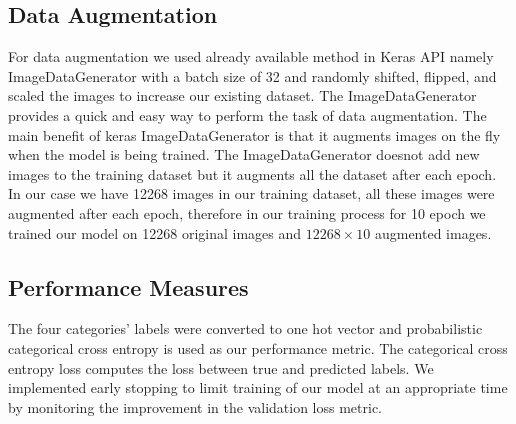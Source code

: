 \documentclass{report}
\begin{document}
\subsection{Data Augmentation}
For data augmentation we used already available method in Keras API namely ImageDataGenerator with a batch size of 32 and randomly shifted, flipped, and scaled the images to increase our existing dataset. The ImageDataGenerator provides a quick and easy way to perform the task of data augmentation.  The main benefit of keras ImageDataGenerator is that it augments images on the fly when the model is being trained.  The ImageDataGenerator doesnot add new images to the training dataset but it augments all the dataset after each epoch. In our case we have 12268 images in our training dataset, all these images were augmented after each epoch, therefore in our training process for 10 epoch we trained our model on 12268 original images and $12268\times10$ augmented images.

\subsection{Performance Measures}
The four categories’ labels were converted to one hot vector and probabilistic categorical cross entropy is used as our performance metric. The categorical cross entropy loss computes the loss between true and predicted labels. We implemented early stopping to limit training of our model at an appropriate time by monitoring the improvement in the validation loss metric. 
\end{document}
